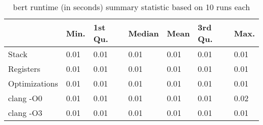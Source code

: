 \begin{table}[h!]
\centering
\begin{tabular}{p{}p{}p{}p{}p{}p{}p{}}
  \hline
 & Min. & 1st Qu. & Median & Mean & 3rd Qu. & Max. \\ 
  \hline
Stack & 0.01 & 0.01 & 0.01 & 0.01 & 0.01 & 0.01 \\ 
  Registers & 0.01 & 0.01 & 0.01 & 0.01 & 0.01 & 0.01 \\ 
  Optimizations & 0.01 & 0.01 & 0.01 & 0.01 & 0.01 & 0.01 \\ 
  clang -O0 & 0.01 & 0.01 & 0.01 & 0.01 & 0.01 & 0.02 \\ 
  clang -O3 & 0.01 & 0.01 & 0.01 & 0.01 & 0.01 & 0.01 \\ 
   \hline
\end{tabular}
\caption{bert runtime (in seconds) summary statistic based on 10 runs each}
\end{table}
